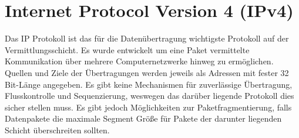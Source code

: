 \section{Internet Protocol Version 4 (IPv4)}


Das IP Protokoll ist das für die Datenübertragung wichtigste Protokoll auf der Vermittlungsschicht. Es wurde entwickelt um eine Paket vermittelte Kommunikation über mehrere Computernetzwerke hinweg zu ermöglichen. Quellen und Ziele der Übertragungen werden jeweils als Adressen mit fester 32 Bit-Länge angegeben. Es gibt keine Mechanismen für zuverlässige Übertragung, Flusskontrolle und Sequenzierung, weswegen das darüber liegende Protokoll dies sicher stellen muss. Es gibt jedoch Möglichkeiten zur Paketfragmentierung, falls Datenpakete die maximale Segment Größe für Pakete der darunter liegenden Schicht überschreiten sollten.

